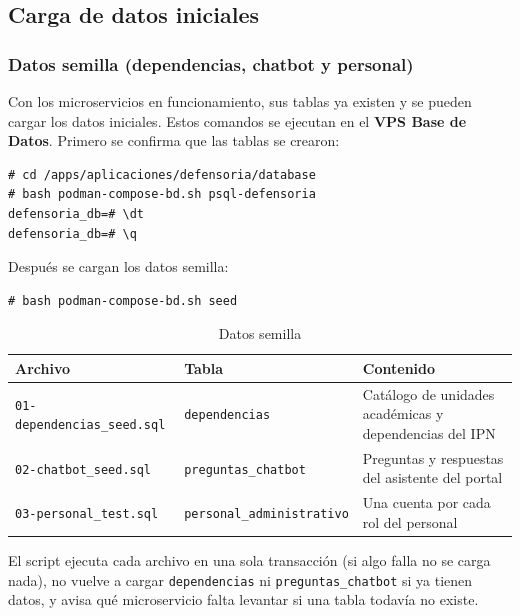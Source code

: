\subsection{Carga de datos iniciales}\label{sec:6_5_datos_semilla}

\subsubsection{Datos semilla (dependencias, chatbot y personal)}
Con los microservicios en funcionamiento, sus tablas ya existen y se pueden cargar los datos iniciales. Estos comandos se ejecutan en el \textbf{VPS Base de Datos}. Primero se confirma que las tablas se crearon:
\begin{lstlisting}
# cd /apps/aplicaciones/defensoria/database
# bash podman-compose-bd.sh psql-defensoria
defensoria_db=# \dt
defensoria_db=# \q
\end{lstlisting}

Después se cargan los datos semilla:
\begin{lstlisting}
# bash podman-compose-bd.sh seed
\end{lstlisting}
\begin{table}[H]
\centering
\caption{Datos semilla}
\footnotesize
\begin{tabular}{p{4.2cm}p{4cm}p{6.2cm}}
\toprule
\textbf{Archivo} & \textbf{Tabla} & \textbf{Contenido} \\
\midrule
\texttt{01-dependencias\_seed.sql} & \texttt{dependencias} & Catálogo de unidades académicas y dependencias del IPN \\
\texttt{02-chatbot\_seed.sql} & \texttt{preguntas\_chatbot} & Preguntas y respuestas del asistente del portal \\
\texttt{03-personal\_test.sql} & \texttt{personal\_administrativo} & Una cuenta por cada rol del personal \\
\bottomrule
\end{tabular}
\end{table}
El script ejecuta cada archivo en una sola transacción (si algo falla no se carga nada), no vuelve a cargar \texttt{dependencias} ni \texttt{preguntas\_chatbot} si ya tienen datos, y avisa qué microservicio falta levantar si una tabla todavía no existe.

